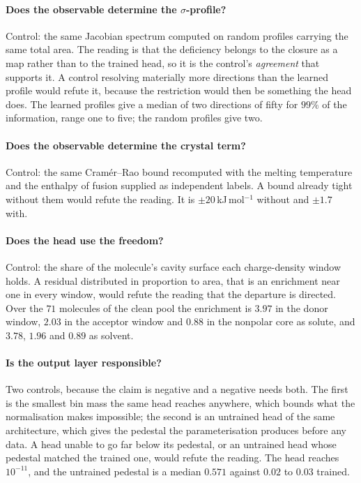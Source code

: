 \paragraph{Does the observable determine the $\sigma$-profile?}
Control: the same Jacobian spectrum computed on random profiles carrying the same total area. The
reading is that the deficiency belongs to the closure as a map rather than to the trained head, so
it is the control's \emph{agreement} that supports it. A control resolving materially more
directions than the learned profile would refute it, because the restriction would then be
something the head does. The learned profiles give a median of two directions of fifty for $99\%$
of the information, range one to five; the random profiles give two.

\paragraph{Does the observable determine the crystal term?}
Control: the same Cram\'er--Rao bound recomputed with the melting temperature and the enthalpy of
fusion supplied as independent labels. A bound already tight without them would refute the reading.
It is $\pm20$\,kJ\,mol$^{-1}$ without and $\pm1.7$ with.

\paragraph{Does the head use the freedom?}
Control: the share of the molecule's cavity surface each charge-density window holds. A residual
distributed in proportion to area, that is an enrichment near one in every window, would refute the
reading that the departure is directed. Over the $71$ molecules of the clean pool the enrichment is
$3.97$ in the donor window, $2.03$ in the acceptor window and $0.88$ in the nonpolar core as
solute, and $3.78$, $1.96$ and $0.89$ as solvent.

\paragraph{Is the output layer responsible?}
Two controls, because the claim is negative and a negative needs both. The first is the smallest
bin mass the same head reaches anywhere, which bounds what the normalisation makes impossible; the
second is an untrained head of the same architecture, which gives the pedestal the parameterisation
produces before any data. A head unable to go far below its pedestal, or an untrained head whose
pedestal matched the trained one, would refute the reading. The head reaches $10^{-11}$, and the
untrained pedestal is a median $0.571$ against $0.02$ to $0.03$ trained.

